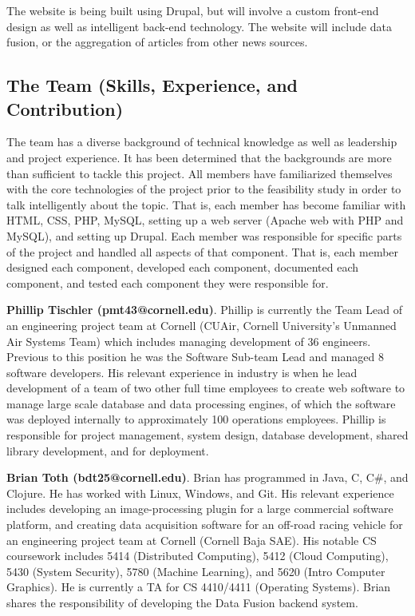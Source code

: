 \documentclass[11pt]{article} %
\begin{document}
The website is being built using Drupal, but will involve a custom front-end design as well as intelligent back-end technology. The website will include data fusion, or the aggregation of articles from other news sources.

\subsection{The Team (Skills, Experience, and Contribution)}

The team has a diverse background of technical knowledge as well as leadership and project experience. It has been determined that the backgrounds are more than sufficient to tackle this project. All members have familiarized themselves with the core technologies of the project prior to the feasibility study in order to talk intelligently about the topic. That is, each member has become familiar with HTML, CSS, PHP, MySQL, setting up a web server (Apache web with PHP and MySQL), and setting up Drupal. Each member was responsible for specific parts of the project and handled all aspects of that component. That is, each member designed each component, developed each component, documented each component, and tested each component they were responsible for.

\textbf{Phillip Tischler (pmt43@cornell.edu)}. Phillip is currently the Team Lead of an engineering project team at Cornell (CUAir, Cornell University’s Unmanned Air Systems Team) which includes managing development of 36 engineers. Previous to this position he was the Software Sub-team Lead and managed 8 software developers. His relevant experience in industry is when he lead development of a team of two other full time employees to create web software to manage large scale database and data processing engines, of which the software was deployed internally to approximately 100 operations employees. Phillip is responsible for project management, system design, database development, shared library development, and for deployment.

\textbf{Brian Toth (bdt25@cornell.edu)}. Brian has programmed in Java, C, C\#, and Clojure. He has worked with Linux, Windows, and Git. His relevant experience includes developing an image-processing plugin for a large commercial software platform, and creating data acquisition software for an off-road racing vehicle for an engineering project team at Cornell (Cornell Baja SAE). His notable CS coursework includes 5414 (Distributed Computing), 5412 (Cloud Computing), 5430 (System Security), 5780 (Machine Learning), and 5620 (Intro Computer Graphics). He is currently a TA for CS 4410/4411 (Operating Systems). Brian shares the responsibility of developing the Data Fusion backend system. 
\end{document}
